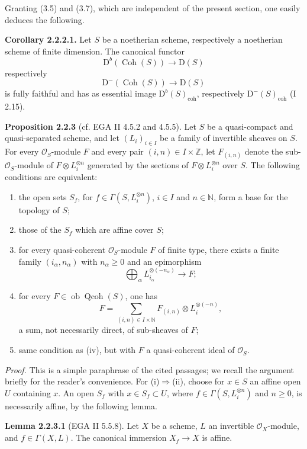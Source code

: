 \documentclass[11pt]{article}
\providecommand{\Qcoh}{\operatorname{Qcoh}}
\providecommand{\Coh}{\operatorname{Coh}}
\providecommand{\Ob}{\operatorname{ob}}
\providecommand{\coh}{\operatorname{coh}}
\begin{document}
Granting (3.5) and (3.7), which are independent of the present section, one easily deduces the following.

\textbf{Corollary 2.2.2.1.} Let $S$ be a noetherian scheme, respectively a noetherian scheme of finite dimension. The canonical functor
\[
\mathrm D^b(\Coh(S))\longrightarrow \mathrm D(S)
\]
respectively
\[
\mathrm D^{-}(\Coh(S))\longrightarrow \mathrm D(S)
\]
is fully faithful and has as essential image $\mathrm D^b(S)_{\coh}$, respectively $\mathrm D^{-}(S)_{\coh}$ (I 2.15).

\textbf{Proposition 2.2.3} (cf. EGA II 4.5.2 and 4.5.5). Let $S$ be a quasi-compact and quasi-separated scheme, and let $(L_i)_{i\in I}$ be a family of invertible sheaves on $S$. For every $\mathcal O_S$-module $F$ and every pair $(i,n)\in I\times\mathbb Z$, let $F_{(i,n)}$ denote the sub-$\mathcal O_S$-module of $F\otimes L_i^{\otimes n}$ generated by the sections of $F\otimes L_i^{\otimes n}$ over $S$. The following conditions are equivalent:
\begin{enumerate}[label=(\roman*)]
\item the open sets $S_f$, for $f\in\Gamma(S,L_i^{\otimes n})$, $i\in I$ and $n\in\mathbb N$, form a base for the topology of $S$;
\item those of the $S_f$ which are affine cover $S$;
\item for every quasi-coherent $\mathcal O_S$-module $F$ of finite type, there exists a finite family $(i_\alpha,n_\alpha)$ with $n_\alpha\ge0$ and an epimorphism
\[
\bigoplus_\alpha L_{i_\alpha}^{\otimes(-n_\alpha)}\longrightarrow F;
\]
\item for every $F\in\Ob\Qcoh(S)$, one has
\[
F=\sum_{(i,n)\in I\times\mathbb N}F_{(i,n)}\otimes L_i^{\otimes(-n)},
\]
a sum, not necessarily direct, of sub-sheaves of $F$;
\item same condition as (iv), but with $F$ a quasi-coherent ideal of $\mathcal O_S$.
\end{enumerate}

\emph{Proof.} This is a simple paraphrase of the cited passages; we recall the argument briefly for the reader's convenience. For (i)$\Rightarrow$(ii), choose for $x\in S$ an affine open $U$ containing $x$. An open $S_f$ with $x\in S_f\subset U$, where $f\in\Gamma(S,L_i^{\otimes n})$ and $n\ge0$, is necessarily affine, by the following lemma.

\textbf{Lemma 2.2.3.1} (EGA II 5.5.8). Let $X$ be a scheme, $L$ an invertible $\mathcal O_X$-module, and $f\in\Gamma(X,L)$. The canonical immersion $X_f\to X$ is affine.
\end{document}
